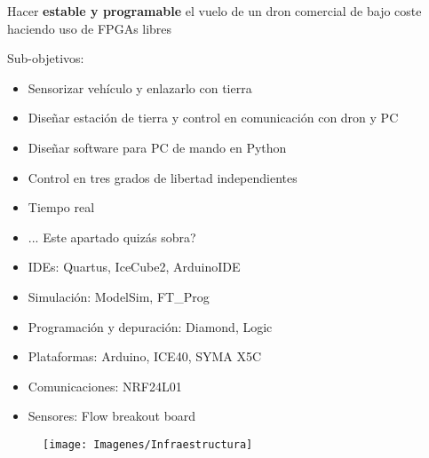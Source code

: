 \documentclass[a4,landscpae]{seminar}
\begin{document}





\begin{hslide}
Hacer \textbf{estable y programable} el vuelo de un dron comercial de
bajo coste haciendo uso de FPGAs libres

Sub-objetivos:
	\begin{itemize}
		\item Sensorizar veh\'iculo y enlazarlo con tierra
		\item Dise\~nar estaci\'on de tierra y control en comunicaci\'on con dron y PC
		\item Dise\~nar software para PC de mando en Python
	\end{itemize}
\end{hslide}


\begin{hslide}
	\begin{itemize}
		\item Control en tres grados de libertad independientes
		\item Tiempo real
		\item ... Este apartado quiz\'as sobra?
	\end{itemize}
\end{hslide}


\begin{hslide}
\begin{minipage}{6.5cm}
	\begin{itemize}
		\item IDEs: Quartus, IceCube2, ArduinoIDE
		\item Simulaci\'on: ModelSim, FT\_Prog
		\item Programaci\'on y depuraci\'on: Diamond, Logic
	\end{itemize}
	\begin{itemize}
		\item Plataformas: Arduino, ICE40, SYMA X5C
		\item Comunicaciones: NRF24L01
		\item Sensores: Flow breakout board

	\end{itemize}
\end{minipage} \hfill
\begin{minipage}{4cm}
	\begin{figure}
		\texttt{[image: Imagenes/Infraestructura]}
	\end{figure}
\end{minipage} \hfill
\end{hslide}
\end{document}

